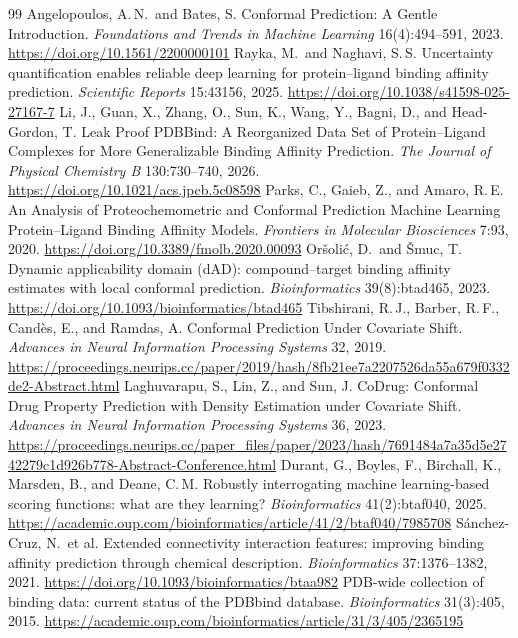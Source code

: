 \documentclass[11pt]{article}
\begin{document}
\begin{thebibliography}{99}
 Angelopoulos, A.\,N.\ and Bates, S. Conformal Prediction: A Gentle Introduction. \emph{Foundations and Trends in Machine Learning} 16(4):494--591, 2023. \url{https://doi.org/10.1561/2200000101}
 Rayka, M.\ and Naghavi, S.\,S. Uncertainty quantification enables reliable deep learning for protein--ligand binding affinity prediction. \emph{Scientific Reports} 15:43156, 2025. \url{https://doi.org/10.1038/s41598-025-27167-7}
 Li, J., Guan, X., Zhang, O., Sun, K., Wang, Y., Bagni, D., and Head-Gordon, T. Leak Proof PDBBind: A Reorganized Data Set of Protein--Ligand Complexes for More Generalizable Binding Affinity Prediction. \emph{The Journal of Physical Chemistry B} 130:730--740, 2026. \url{https://doi.org/10.1021/acs.jpcb.5c08598}
 Parks, C., Gaieb, Z., and Amaro, R.\,E. An Analysis of Proteochemometric and Conformal Prediction Machine Learning Protein--Ligand Binding Affinity Models. \emph{Frontiers in Molecular Biosciences} 7:93, 2020. \url{https://doi.org/10.3389/fmolb.2020.00093}
 Or{\v s}oli{\'c}, D.\ and {\v S}muc, T. Dynamic applicability domain (dAD): compound--target binding affinity estimates with local conformal prediction. \emph{Bioinformatics} 39(8):btad465, 2023. \url{https://doi.org/10.1093/bioinformatics/btad465}
 Tibshirani, R.\,J., Barber, R.\,F., Cand{\`e}s, E., and Ramdas, A. Conformal Prediction Under Covariate Shift. \emph{Advances in Neural Information Processing Systems} 32, 2019. \url{https://proceedings.neurips.cc/paper/2019/hash/8fb21ee7a2207526da55a679f0332de2-Abstract.html}
 Laghuvarapu, S., Lin, Z., and Sun, J. CoDrug: Conformal Drug Property Prediction with Density Estimation under Covariate Shift. \emph{Advances in Neural Information Processing Systems} 36, 2023. \url{https://proceedings.neurips.cc/paper_files/paper/2023/hash/7691484a7a35d5e2742279c1d926b778-Abstract-Conference.html}
 Durant, G., Boyles, F., Birchall, K., Marsden, B., and Deane, C.\,M. Robustly interrogating machine learning-based scoring functions: what are they learning? \emph{Bioinformatics} 41(2):btaf040, 2025. \url{https://academic.oup.com/bioinformatics/article/41/2/btaf040/7985708}
 S{\'a}nchez-Cruz, N.\ et al. Extended connectivity interaction features: improving binding affinity prediction through chemical description. \emph{Bioinformatics} 37:1376--1382, 2021. \url{https://doi.org/10.1093/bioinformatics/btaa982}
 PDB-wide collection of binding data: current status of the PDBbind database. \emph{Bioinformatics} 31(3):405, 2015. \url{https://academic.oup.com/bioinformatics/article/31/3/405/2365195}
\end{thebibliography}
\end{document}
